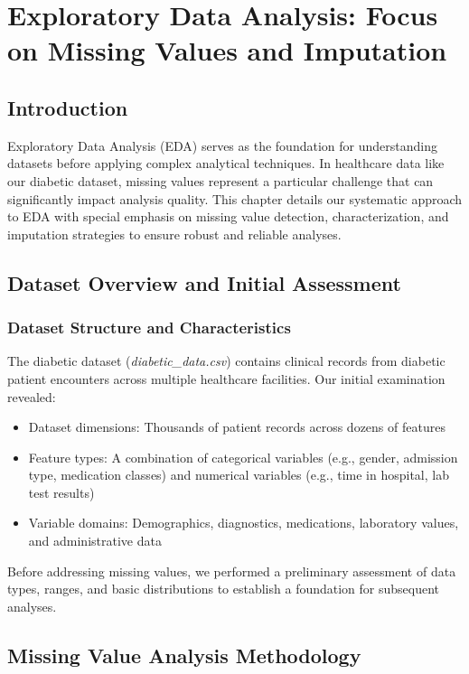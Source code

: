 \chapter{Exploratory Data Analysis: Focus on Missing Values and Imputation}

\section{Introduction}
Exploratory Data Analysis (EDA) serves as the foundation for understanding datasets before applying complex analytical techniques. In healthcare data like our diabetic dataset, missing values represent a particular challenge that can significantly impact analysis quality. This chapter details our systematic approach to EDA with special emphasis on missing value detection, characterization, and imputation strategies to ensure robust and reliable analyses.

\section{Dataset Overview and Initial Assessment}

\subsection{Dataset Structure and Characteristics}
The diabetic dataset (\textit{diabetic\_data.csv}) contains clinical records from diabetic patient encounters across multiple healthcare facilities. Our initial examination revealed:

\begin{itemize}
    \item Dataset dimensions: Thousands of patient records across dozens of features
    \item Feature types: A combination of categorical variables (e.g., gender, admission type, medication classes) and numerical variables (e.g., time in hospital, lab test results)
    \item Variable domains: Demographics, diagnostics, medications, laboratory values, and administrative data
\end{itemize}

Before addressing missing values, we performed a preliminary assessment of data types, ranges, and basic distributions to establish a foundation for subsequent analyses.

\section{Missing Value Analysis Methodology}
\label{sec:missing_methodology}

